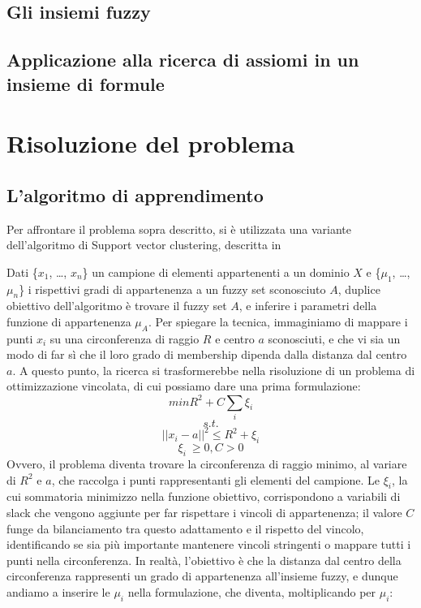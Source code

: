 \documentclass[12pt,a4paper]{report}
\begin{document}
\section{Gli insiemi fuzzy}
\section{Applicazione alla ricerca di assiomi in un insieme di formule}

\chapter{Risoluzione del problema}
\section{L'algoritmo di apprendimento}
Per affrontare il problema sopra descritto, si è utilizzata una variante dell'algoritmo di Support vector clustering, descritta in \cite{svpaper}

Dati \{$x_1$, \dots , $x_n$\} un campione di elementi appartenenti a un dominio $X$ e  \{$\mu_1$, \dots , $\mu_n$\} i rispettivi gradi di appartenenza a un fuzzy set sconosciuto $A$, duplice obiettivo dell'algoritmo è trovare il fuzzy set $A$,  e inferire i parametri della funzione di appartenenza $\mu_A$. Per spiegare la tecnica, immaginiamo di mappare i punti  $x_i$ su una circonferenza di raggio $R$  e centro $a$ sconosciuti, e che vi sia un modo di far sì che il  loro  grado di membership dipenda dalla distanza dal centro $a$.
A questo punto, la ricerca si trasformerebbe nella risoluzione di un problema di ottimizzazione vincolata, di cui possiamo dare una prima formulazione:
\[ min R^2 + C\sum_{i} \xi_{i}\]
\[s.t.\]
\[||x_i - a||^2  \leq R^2 + \xi_{i}\]
\[ \xi_{i}\ \geq 0, C > 0\]
Ovvero, il problema diventa trovare la circonferenza di raggio minimo, al variare di $R^2$ e $a$, che raccolga i punti rappresentanti gli elementi del campione.
Le $\xi_i$, la cui sommatoria minimizzo nella funzione obiettivo, corrispondono a variabili di slack che vengono aggiunte per far rispettare i vincoli di appartenenza; il valore $C$ funge da bilanciamento tra questo adattamento e il rispetto del vincolo, identificando se sia più importante mantenere vincoli stringenti o mappare tutti i punti nella circonferenza.
In realtà, l'obiettivo è che la distanza dal centro della circonferenza rappresenti un grado di appartenenza all'insieme fuzzy, e dunque andiamo a inserire le $\mu_i$ nella formulazione, che diventa, moltiplicando per $\mu_i$:
\end{document}
